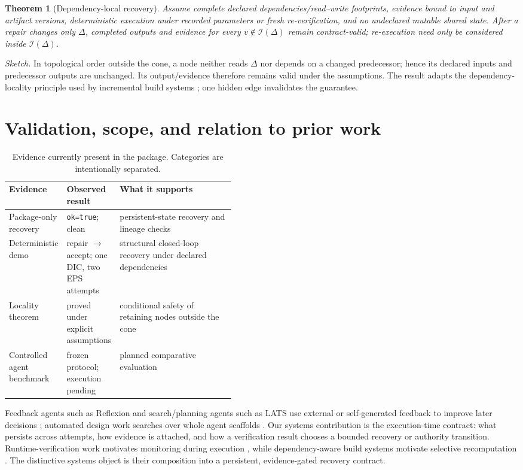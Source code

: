 \documentclass{article}
\newtheorem{theorem}{Theorem}
\begin{document}
\begin{theorem}[Dependency-local recovery]
Assume complete declared dependencies/read--write footprints, evidence bound to input and artifact versions, deterministic execution under recorded parameters or fresh re-verification, and no undeclared mutable shared state. After a repair changes only $\Delta$, completed outputs and evidence for every $v\notin\mathcal I(\Delta)$ remain contract-valid; re-execution need only be considered inside $\mathcal I(\Delta)$.
\end{theorem}
\emph{Sketch.} In topological order outside the cone, a node neither reads $\Delta$ nor depends on a changed predecessor; hence its declared inputs and predecessor outputs are unchanged. Its output/evidence therefore remains valid under the assumptions. The result adapts the dependency-locality principle used by incremental build systems \citep{mokhov2018build}; one hidden edge invalidates the guarantee.

\section{Validation, scope, and relation to prior work}
\begin{table}[t]
\caption{Evidence currently present in the package. Categories are intentionally separated.}
\label{tab:evidence}
\centering
\small
\begin{tabularx}{\linewidth}{@{}p{0.21\linewidth}p{0.23\linewidth}X@{}}
\toprule
Evidence & Observed result & What it supports \\
\midrule
Package-only recovery & \texttt{ok=true}; clean & persistent-state recovery and lineage checks \\
Deterministic demo & repair $\to$ accept; one DIC, two EPS attempts & structural closed-loop recovery under declared dependencies \\
Locality theorem & proved under explicit assumptions & conditional safety of retaining nodes outside the cone \\
Controlled agent benchmark & frozen protocol; execution pending & planned comparative evaluation \\
\bottomrule
\end{tabularx}
\end{table}

Feedback agents such as Reflexion and search/planning agents such as LATS use external or self-generated feedback to improve later decisions \citep{shinn2023reflexion,zhou2024lats}; automated design work searches over whole agent scaffolds \citep{hu2025adas}. Our systems contribution is the execution-time contract: what persists across attempts, how evidence is attached, and how a verification result chooses a bounded recovery or authority transition. Runtime-verification work motivates monitoring during execution \citep{leucker2009runtime}, while dependency-aware build systems motivate selective recomputation \citep{mokhov2018build}. The distinctive systems object is their composition into a persistent, evidence-gated recovery contract.
\end{document}
